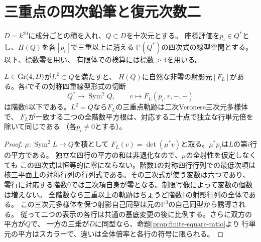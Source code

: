 \section{三重点の四次鉛筆と復元次数二}
\label{sec:configuration-quartic-pencil}
$D=k^{20}$に成分ごとの積を入れ、$Q\subset D$を十次元とする。
座標評価を$p_i\in Q^*$とし、$H(Q)$を各$[p_i]$で三重以上に消える
$\mathbb P(Q^*)$の四次式の線型空間とする。以下、標数零を用い、
有限体での検算には標数$> 4$を用いる。

\begin{proposition}\label{prop:quartic-root-pencil}
$L\in\operatorname{Gr}(4,D)$が$L^2\subset Q$を満たすと、
$H(Q)$に自然な非零の射影元$[F_L]$がある。各$i$でその対称四重線型形式の切断
\[
 Q^*\longrightarrow \operatorname{Sym}^2 Q,\qquad
 v\longmapsto F_L(p_i,v,-,-)
\]
は階数6以下である。$L^2=Q$なら$F_L$の三重点軌跡は二次Veronese三次元多様体で、
$F_L$が一致する二つの全階数平方根は、対応する二十点で独立な行単元倍を除いて同じである
（各$p_i\ne0$とする）。
\end{proposition}
\begin{proof}
$\mu:\operatorname{Sym}^2L\to Q$を積として
$F_L(v)=\det(\mu^*v)$と取る。$\mu^*p_i$は$L$の第$i$行の平方である。
独立な四行の平方の和は非退化なので、$\mu$の全射性を仮定しなくても
この四次式は恒等的に零にならない。階数1の対称四行行列での最低次項は
核三平面上の対称行列の行列式である。その三次式が使う変数は六つであり、
零行に対応する階数0では三次項自身が零となる。制限写像によって変数の個数は増えない。
全階数なら三重以上の軌跡はちょうど階数1の射影行列の全体である。
この三次元多様体を保つ射影自己同型は元の$\mathbb P^3$の自己同型から誘導される。
従って二つの表示の各行は共通の基底変更の後に比例する。さらに双方の平方が$Q$で、
一方の三乗が$D$に同型なら、命題\ref{prop:finite-square-ratio}より
行単元の平方はスカラーで、違いは全体倍率と各行の符号に限られる。
\end{proof}

